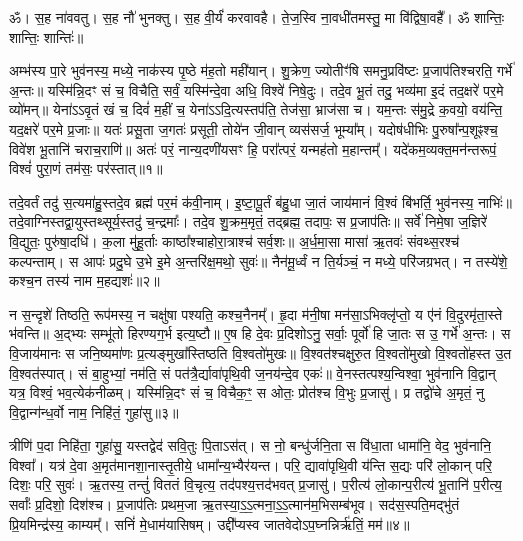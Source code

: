 \setcounter{anuvakam}{0}
ॐ। स॒ह ना॑ववतु। 
स॒ह नौ॑ भुनक्तु। 
स॒ह वी॒र्यं॑ करवावहै। 
ते॒ज॒स्वि ना॒वधी॑तमस्तु॒ मा वि॑द्विषा॒वहै᳚। 
ॐ शान्तिः॒ शान्तिः॒ शान्तिः॑॥

अम्भ॑स्य पा॒रे भुव॑नस्य॒ मध्ये॒ नाक॑स्य पृ॒ष्ठे म॑ह॒तो मही॑यान्। 
शु॒क्रेण॒ ज्योतीꣳ॑षि समनु॒प्रवि॑ष्टः प्र॒जाप॑तिश्चरति॒ गर्भे॑ अ॒न्तः॥ 
यस्मि॑न्नि॒दꣳ सं च॒ विचैति॒ सर्वं॒ यस्मि॑न्दे॒वा अधि॒ विश्वे॑ निषे॒दुः। 
तदे॒व भू॒तं तदु॒ भव्य॑मा इ॒दं तद॒क्षरे॑ पर॒मे व्यो॑मन्॥ 
येना॑ऽऽवृ॒तं खं च॒ दिवं॑ म॒हीं च॒ येना॑ऽऽदि॒त्यस्तप॑ति॒ तेज॑सा॒ भ्राज॑सा च। 
यम॒न्तः स॑मु॒द्रे क॒वयो॒ वय॑न्ति॒ यद॒क्षरे॑ पर॒मे प्र॒जाः॥ 
यतः॑ प्रसू॒ता ज॒गतः॑ प्रसूती॒ तोये॑न जी॒वान् व्यस॑सर्ज॒ भूम्या᳚म्। 
यदोष॑धीभिः पु॒रुषा᳚न्प॒शूꣴश्च॒ विवे॑श भू॒तानि॑ चराच॒राणि॑॥ 
अतः॑ परं॒ नान्य॒दणी॑यसꣳ हि॒ परा᳚त्परं॒ यन्मह॑तो म॒हान्तम्᳚। 
यदे॑कम॒व्यक्त॒मन॑न्तरूपं॒ विश्वं॑ पुरा॒णं तम॑सः॒ पर॑स्तात्॥१॥

तदे॒वर्तं तदु॑ स॒त्यमा॑हु॒स्तदे॒व ब्रह्म॑ पर॒मं क॑वी॒नाम्। 
इ॒ष्टा॒पू॒र्तं ब॑हु॒धा जा॒तं जाय॑मानं वि॒श्वं बि॑भर्ति॒ भुव॑नस्य॒ नाभिः॑॥ 
तदे॒वाग्निस्तद्वा॒युस्तथ्सूर्य॒स्तदु॑ च॒न्द्रमाः᳚। 
तदे॒व शु॒क्रम॒मृतं॒ तद्ब्रह्म॒ तदापः॒ स प्र॒जाप॑तिः॥ 
सर्वे॑ निमे॒षा ज॒ज्ञिरे॑ वि॒द्युतः॒ पुरु॑षा॒दधि॑। 
क॒ला मु॑हू॒र्ताः काष्ठा᳚श्चाहोरा॒त्राश्च॑ सर्व॒शः॥ 
अ॒र्ध॒मा॒सा मासा॑ ऋ॒तवः॑ संवथ्स॒रश्च॑ कल्पन्ताम्। 
स आपः॑ प्रदु॒घे उ॒भे इ॒मे अ॒न्तरि॑क्ष॒मथो॒ सुवः॑॥ 
नैन॑मू॒र्ध्वं न ति॒र्यञ्चं॒ न मध्ये॒ परि॑जग्रभत्। 
न तस्ये॑शे॒ कश्च॒न तस्य॑ नाम म॒हद्यशः॑॥२॥

न स॒न्दृशे॑ तिष्ठति॒ रूप॑मस्य॒ न चक्षु॑षा पश्यति॒ कश्च॒नैनम्᳚। 
हृ॒दा म॑नी॒षा मन॑सा॒ऽभिक्लृ॑प्तो॒ य ए॑नं वि॒दुरमृ॑ता॒स्ते भ॑वन्ति॥ 
अ॒द्भ्यः सम्भू॑तो हिरण्यग॒र्भ इत्य॒ष्टौ॥ 
ए॒ष हि दे॒वः प्र॒दिशोऽनु॒ सर्वाः॒ पूर्वो॑ हि जा॒तः स उ॒ गर्भे॑ अ॒न्तः। 
स वि॒जाय॑मानः स जनि॒ष्यमा॑णः प्र॒त्यङ्मुखा᳚स्तिष्ठति वि॒श्वतो॑मुखः॥ 
वि॒श्वत॑श्चक्षुरु॒त वि॒श्वतो॑मुखो वि॒श्वतो॑हस्त उ॒त वि॒श्वत॑स्पात्। 
सं बा॒हुभ्यां॒ नम॑ति॒ सं पत॑त्रै॒र्द्यावा॑पृथि॒वी ज॒नय॑न्दे॒व एकः॑॥ 
वे॒नस्तत्पश्य॒न्विश्वा॒ भुव॑नानि वि॒द्वान् यत्र॒ विश्वं॒ भव॒त्येक॑नीळम्। 
यस्मि॑न्नि॒दꣳ सं च॒ विचैक॒ꣳ॒ स ओतः॒ प्रोत॑श्च वि॒भुः प्र॒जासु॑। 
प्र तद्वो॑चे अ॒मृतं॒ नु वि॒द्वान्ग॑न्ध॒र्वो नाम॒ निहि॑तं॒ गुहा॑सु॥३॥

त्रीणि॑ प॒दा निहि॑ता॒ गुहा॑सु॒ यस्तद्वेद॑ सवि॒तुः पि॒ताऽस॑त्। 
स नो॒ बन्धु॑र्जनि॒ता स वि॑धा॒ता धामा॑नि॒ वेद॒ भुव॑नानि॒ विश्वा᳚। 
यत्र॑ दे॒वा अ॒मृत॑मानशा॒नास्तृ॒तीये॒ धामा᳚न्य॒भ्यैर॑यन्त। 
परि॒ द्यावा॑पृथि॒वी य॑न्ति स॒द्यः परि॑ लो॒कान् परि॒ दिशः॒ परि॒ सुवः॑। 
ऋ॒तस्य॒ तन्तुं॑ विततं वि॒चृत्य॒ तद॑पश्य॒त्तद॑भवत् प्र॒जासु॑। 
प॒रीत्य॑ लो॒कान्प॒रीत्य॑ भू॒तानि॑ प॒रीत्य॒ सर्वाः᳚ प्र॒दिशो॒ दिश॑श्च। 
प्र॒जाप॑तिः प्रथम॒जा ऋ॒तस्या॒ऽ॒ऽ॒त्मना॒ऽ॒ऽ॒त्मान॑म॒भिसम्ब॑भूव। 
सद॑स॒स्पति॒मद्भु॑तं प्रि॒यमिन्द्र॑स्य॒ काम्यम्᳚। 
सनिं॑ मे॒धाम॑यासिषम्। 
उद्दी᳚प्यस्व जातवेदोऽप॒घ्नन्निर्\mbox{}ऋ॑तिं॒ मम॑॥४॥

